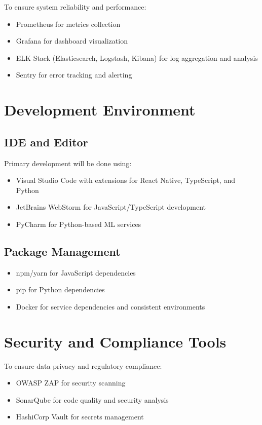 \documentclass[12pt,a4paper]{report}
\begin{document}
To ensure system reliability and performance:
\begin{itemize}
    \item Prometheus for metrics collection
    \item Grafana for dashboard visualization
    \item ELK Stack (Elasticsearch, Logstash, Kibana) for log aggregation and analysis
    \item Sentry for error tracking and alerting
\end{itemize}

\section*{Development Environment}

\subsection*{IDE and Editor}

Primary development will be done using:
\begin{itemize}
    \item Visual Studio Code with extensions for React Native, TypeScript, and Python
    \item JetBrains WebStorm for JavaScript/TypeScript development
    \item PyCharm for Python-based ML services
\end{itemize}

\subsection*{Package Management}

\begin{itemize}
    \item npm/yarn for JavaScript dependencies
    \item pip for Python dependencies
    \item Docker for service dependencies and consistent environments
\end{itemize}

\section*{Security and Compliance Tools}

To ensure data privacy and regulatory compliance:
\begin{itemize}
    \item OWASP ZAP for security scanning
    \item SonarQube for code quality and security analysis
    \item HashiCorp Vault for secrets management
\end{itemize}
\end{document}
